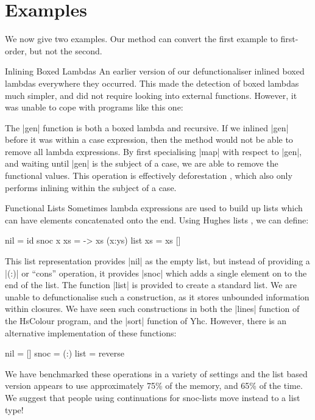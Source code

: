 \section{Examples}
\label{secF:examples}

We now give two examples. Our method can convert the first example to first-order, but not the second.

\begin{examplename}{Inlining Boxed Lambdas}
\label{exF:inlining_boxed_lambdas}
An earlier version of our defunctionaliser inlined boxed lambdas everywhere they occurred. This made the detection of boxed lambdas much simpler, and did not require looking into external functions. However, it was unable to cope with programs like this one:


The |gen| function is both a boxed lambda and recursive. If we inlined |gen| before it was within a case expression, then the method would not be able to remove all lambda expressions. By first specialising |map| with respect to |gen|, and waiting until |gen| is the subject of a case, we are able to remove the functional values. This operation is effectively deforestation \cite{wadler:deforestation}, which also only performs inlining within the subject of a case.
\end{examplename}

\begin{examplename}{Functional Lists}
\label{exF:functional_lists}
Sometimes lambda expressions are used to build up lists which can have elements concatenated onto the end. Using Hughes lists \cite{hughes:lists}, we can define:

\begin{code}
nil = id
snoc x xs = \ys -> xs (x:ys)
list xs = xs []
\end{code}

This list representation provides |nil| as the empty list, but instead of providing a |(:)| or ``cons'' operation, it provides |snoc| which adds a single element on to the end of the list. The function |list| is provided to create a standard list. We are unable to defunctionalise such a construction, as it stores unbounded information within closures. We have seen such constructions in both the |lines| function of the HsColour program, and the |sort| function of Yhc. However, there is an alternative implementation of these functions:

\begin{code}
nil = []
snoc = (:)
list = reverse
\end{code}

We have benchmarked these operations in a variety of settings and the list based version appears to use approximately 75\% of the memory, and 65\% of the time. We suggest that people using continuations for snoc-lists move instead to a list type!
\end{examplename}


